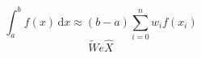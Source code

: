 \documentclass{article}
\begin{document}
\[
  \int_a^b f(x)\,\mathrm{d}x \approx (b-a)
  \sum_{i=0}^n w_i f(x_i)
\]
\[
  \tilde{W} \dot{e} \hat{X}
\]
\end{document}
